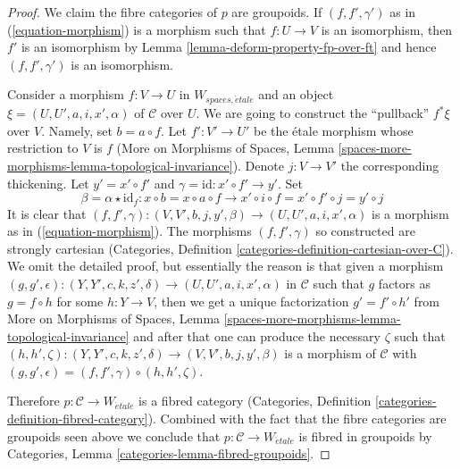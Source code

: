 \documentclass[10pt,a4paper]{amsart}
\theoremstyle{plain}
\theoremstyle{definition}
\theoremstyle{remark}
\numberwithin{equation}{subsection}
\def\etale{{\acute{e}tale}}
\begin{document}
\begin{proof}
We claim the fibre categories of $p$ are groupoids.
If $(f, f', \gamma')$ as in (\ref{equation-morphism})
is a morphism such that $f : U \to V$ is an isomorphism, then
$f'$ is an isomorphism by Lemma \ref{lemma-deform-property-fp-over-ft}
and hence $(f, f', \gamma')$ is an isomorphism.

\medskip\noindent
Consider a morphism $f : V \to U$ in $W_{spaces, \etale}$
and an object $\xi = (U, U', a, i, x', \alpha)$
of $\mathcal{C}$ over $U$. We are going to construct the ``pullback''
$f^*\xi$ over $V$. 
Namely, set $b = a \circ f$. Let $f' : V' \to U'$ be the \'etale morphism
whose restriction to $V$ is $f$ (More on Morphisms of Spaces,
Lemma \ref{spaces-more-morphisms-lemma-topological-invariance}).
Denote $j : V \to V'$ the corresponding thickening.
Let $y' = x' \circ f'$ and $\gamma = \text{id} : x' \circ f' \to y'$.
Set
$$
\beta = \alpha \star \text{id}_f :
x \circ b = x \circ a \circ f \to
x' \circ i \circ f = x' \circ f' \circ j = y' \circ j
$$
It is clear that $(f, f', \gamma) : (V, V', b, j, y', \beta) \to
(U, U', a, i, x', \alpha)$ is a morphism as in
(\ref{equation-morphism}). The morphisms $(f, f', \gamma)$
so constructed are strongly cartesian
(Categories, Definition \ref{categories-definition-cartesian-over-C}).
We omit the detailed proof, but essentially the reason is that
given a morphism
$(g, g', \epsilon) : (Y, Y', c, k, z', \delta) \to (U, U', a, i, x', \alpha)$
in $\mathcal{C}$ such that $g$ factors as $g = f \circ h$ for some
$h : Y \to V$, then we get a unique factorization $g' = f' \circ h'$
from More on Morphisms of Spaces,
Lemma \ref{spaces-more-morphisms-lemma-topological-invariance}
and after that one can produce the necessary $\zeta$ such that
$(h, h', \zeta) :  (Y, Y', c, k, z', \delta) \to
(V, V', b, j, y', \beta)$ is a morphism of $\mathcal{C}$
with $(g, g', \epsilon) = (f, f', \gamma) \circ (h, h', \zeta)$.

\medskip\noindent
Therefore $p : \mathcal{C} \to W_\etale$ is a fibred
category (Categories, Definition \ref{categories-definition-fibred-category}).
Combined with the fact that the fibre categories are groupoids
seen above we conclude that $p : \mathcal{C} \to W_\etale$
is fibred in groupoids by Categories, Lemma
\ref{categories-lemma-fibred-groupoids}.
\end{proof}
\end{document}
